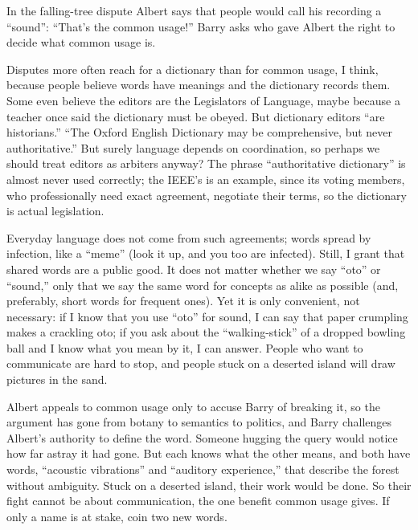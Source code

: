 
In the falling-tree dispute Albert says that people would call his recording a ``sound'': ``That's the common usage!'' Barry asks who gave Albert the right to decide what common usage is.

Disputes more often reach for a dictionary than for common usage, I think, because people believe words have meanings and the dictionary records them. Some even believe the editors are the Legislators of Language, maybe because a teacher once said the dictionary must be obeyed. But dictionary editors ``are historians.'' ``The Oxford English Dictionary may be comprehensive, but never authoritative.''  But surely language depends on coordination, so perhaps we should treat editors as arbiters anyway? The phrase ``authoritative dictionary'' is almost never used correctly; the IEEE's is an example, since its voting members, who professionally need exact agreement, negotiate their terms, so the dictionary is actual legislation. 

Everyday language does not come from such agreements; words spread by infection, like a ``meme'' (look it up, and you too are infected). Still, I grant that shared words are a public good. It does not matter whether we say ``oto'' or ``sound,'' only that we say the same word for concepts as alike as possible (and, preferably, short words for frequent ones). Yet it is only convenient, not necessary: if I know that you use ``oto'' for sound, I can say that paper crumpling makes a crackling oto; if you ask about the ``walking-stick'' of a dropped bowling ball and I know what you mean by it, I can answer. People who want to communicate are hard to stop, and people stuck on a deserted island will draw pictures in the sand.

Albert appeals to common usage only to accuse Barry of breaking it, so the argument has gone from botany to semantics to politics, and Barry challenges Albert's authority to define the word. Someone hugging the query would notice how far astray it had gone. But each knows what the other means, and both have words, ``acoustic vibrations'' and ``auditory experience,'' that describe the forest without ambiguity. Stuck on a deserted island, their work would be done. So their fight cannot be about communication, the one benefit common usage gives. If only a name is at stake, coin two new words.

